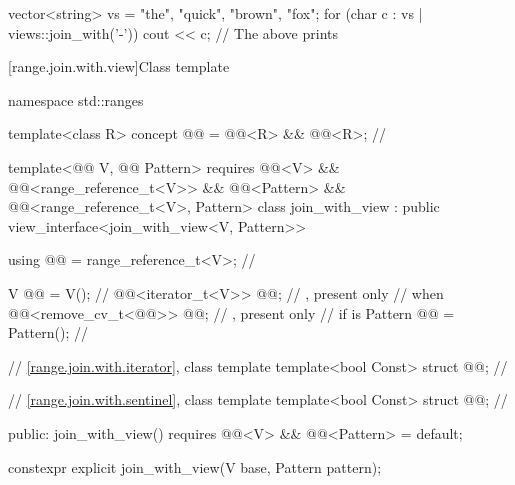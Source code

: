 \pnum
\begin{example}
\begin{codeblock}
vector<string> vs = {"the", "quick", "brown", "fox"};
for (char c : vs | views::join_with('-')) {
  cout << c;
}
// The above prints 
\end{codeblock}
\end{example}

[range.join.with.view]{Class template }

\begin{codeblock}
namespace std::ranges {
  template<class R>
  concept @@ = @@<R> && @@<R>;    // \expos

  template<@@ V, @@ Pattern>
    requires @@<V> && @@<range_reference_t<V>>
          && @@<Pattern>
          && @@<range_reference_t<V>, Pattern>
  class join_with_view : public view_interface<join_with_view<V, Pattern>> {
    using @@ = range_reference_t<V>;                  // \expos

    V @@ = V();                                          // \expos
    @@<iterator_t<V>> @@;         // \expos, present only
                                                            // when 
    @@<remove_cv_t<@@>> @@;   // \expos, present only
                                                            // if  is 
    Pattern @@ = Pattern();                           // \expos

    // \ref{range.join.with.iterator}, class template 
    template<bool Const> struct @@;                   // \expos

    // \ref{range.join.with.sentinel}, class template 
    template<bool Const> struct @@;                   // \expos

  public:
    join_with_view()
      requires @@<V> && @@<Pattern> = default;

    constexpr explicit join_with_view(V base, Pattern pattern);

}}
\end{codeblock}
